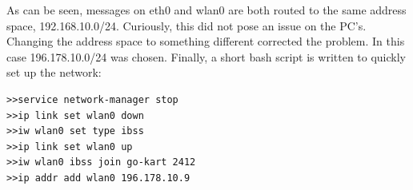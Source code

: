 As can be seen, messages on eth0 and wlan0 are both routed to the same address space, 192.168.10.0/24.
Curiously, this did not pose an issue on the PC's.
Changing the address space to something different corrected the problem.
In this case 196.178.10.0/24 was chosen.
Finally, a short bash script is written to quickly set up the network:
\begin{lstlisting}
>>service network-manager stop
>>ip link set wlan0 down
>>iw wlan0 set type ibss
>>ip link set wlan0 up
>>iw wlan0 ibss join go-kart 2412
>>ip addr add wlan0 196.178.10.9
\end{lstlisting}
